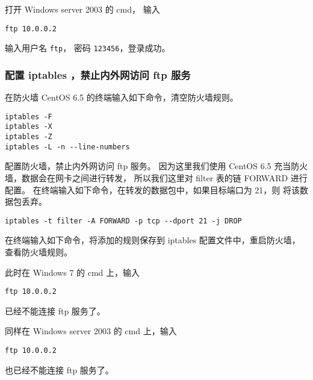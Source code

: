 打开 Windows server 2003 的 cmd，
输入
\begin{verbatim}
ftp 10.0.0.2
\end{verbatim}
输入用户名 \texttt{ftp}，
密码 \texttt{123456}，登录成功。
%
\subsubsection{配置 iptables ，禁止内外网访问 ftp 服务}
在防火墙 CentOS 6.5 的终端输入如下命令，清空防火墙规则。
\begin{verbatim}
iptables -F
iptables -X
iptables -Z
iptables -L -n --line-numbers
\end{verbatim}

配置防火墙，禁止内外网访问 ftp 服务。
因为这里我们使用 CentOS 6.5 充当防火墙，数据会在网卡之间进行转发，
所以我们这里对 filter 表的链 FORWARD 进行配置。
在终端输入如下命令，在转发的数据包中，如果目标端口为 21，则
将该数据包丢弃。
\begin{verbatim}
iptables -t filter -A FORWARD -p tcp --dport 21 -j DROP
\end{verbatim}

在终端输入如下命令，将添加的规则保存到 iptables 配置文件中，重启防火墙，
查看防火墙规则。

此时在 Windows 7 的 cmd 上，输入
\begin{verbatim}
ftp 10.0.0.2
\end{verbatim}
已经不能连接 ftp 服务了。

同样在 Windows server 2003 的 cmd 上，输入
\begin{verbatim}
ftp 10.0.0.2
\end{verbatim}
也已经不能连接 ftp 服务了。
%
